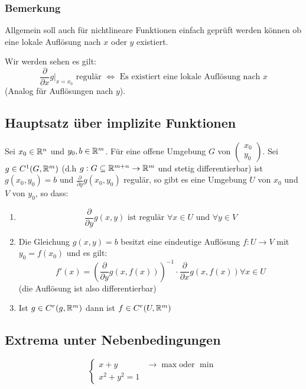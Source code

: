 \subsubsection{Bemerkung}
Allgemein soll auch für nichtlineare Funktionen einfach geprüft werden können ob
eine lokale Auflösung nach $x$ oder $y$ existiert.

Wir werden sehen es gilt:
\begin{equation}
    \frac{\partial}{\partial x} g \vert_{x=x_0} \text{ regulär } \Leftrightarrow
    \text{ Es existiert eine lokale Auflösung nach }x
\end{equation}
(Analog für Auflösungen nach $y$).

\subsection{Hauptsatz über implizite Funktionen}
Sei $x_0 \in \mathbb{R}^n$ und $y_0, b \in \mathbb{R}^m$. Für eine offene Umgebung $G$ von
$\left(\begin{smallmatrix}x_0\\y_0\end{smallmatrix}\right)$. Sei $g \in C^1(G, \mathbb{R}^m)$
(d.h $g: G \subseteq \mathbb{R}^{m + n} \rightarrow \mathbb{R}^m$ und stetig differentierbar) ist
$g(x_0, y_0)=b$ und $\frac{\partial}{\partial y} g(x_0, y_0)$ regulär, so gibt
es eine Umgebung $U$ von $x_0$ und $V$ von $y_0$, so dass:
\begin{enumerate}[label= (\alph*)]
    \item
        \begin{equation*}
            \frac{\partial}{\partial y} g(x, y) \text{ ist regulär }
            \forall x \in U \text{ und } \forall y \in V
        \end{equation*}
    \item Die Gleichung $g(x,y)=b$ besitzt eine eindeutige Auflösung
        $f: U \rightarrow V$ mit $y_0 = f(x_0)$ und es gilt:
        \begin{equation*}
            f'(x) = {(\frac{\partial}{\partial y} g(x, f(x)) )}^{-1} \cdot
            \frac{\partial}{\partial x} g(x, f(x)) \forall x \in U
        \end{equation*}
        (die Auflösung ist also differentierbar)
    \item Ist $g \in C^r (g, \mathbb{R}^m)$ dann ist $f \in C^r(U, \mathbb{R}^m)$
\end{enumerate}

\subsection{Extrema unter Nebenbedingungen}
\begin{equation*}
    \begin{cases}
        x+y & \rightarrow \max \text{oder } \min \\
        x^2 + y^2 = 1
    \end{cases}
\end{equation*}

